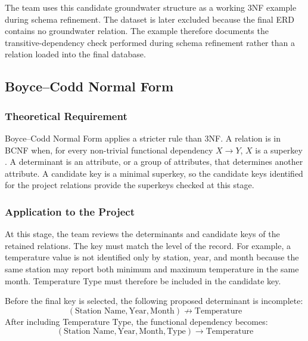 The team uses this candidate groundwater structure as a working 3NF example
during schema refinement. The dataset is later excluded because the final ERD
contains no groundwater relation. The example therefore documents the
transitive-dependency check performed during schema refinement rather than a
relation loaded into the final database.
\subsection{Boyce--Codd Normal Form}
\label{subsec:bcnf}

\subsubsection{Theoretical Requirement}

Boyce--Codd Normal Form applies a stricter rule than 3NF. A relation is in BCNF
when, for every non-trivial functional dependency \(X \rightarrow Y\), \(X\) is a
superkey \cite{codd1972further}. A determinant is an attribute, or a group of
attributes, that determines another attribute. A candidate key is a minimal
superkey, so the candidate keys identified for the project relations provide
the superkeys checked at this stage.

\subsubsection{Application to the Project}

At this stage, the team reviews the determinants and candidate keys of the
retained relations. The key must match the level of the record. For example, a
temperature value is not identified only by station, year, and month because
the same station may report both minimum and maximum temperature in the same
month. Temperature Type must therefore be included in the candidate key.

Before the final key is selected, the following proposed determinant is
incomplete:
\[
(\text{Station Name},\text{Year},\text{Month})
\nrightarrow \text{Temperature}
\]
After including Temperature Type, the functional dependency becomes:
\[
(\text{Station Name},\text{Year},\text{Month},\text{Type})
\rightarrow \text{Temperature}
\]

